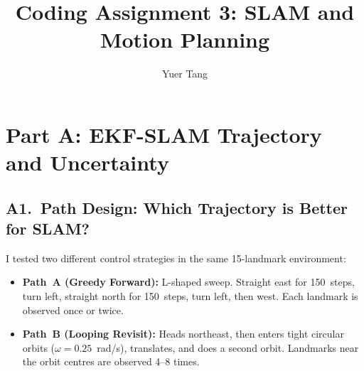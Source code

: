 \documentclass[10pt]{article}
\title{\textbf{Coding Assignment 3: SLAM and Motion Planning}}
\author{Yuer Tang}
\date{}
\begin{document}
\maketitle
\vspace{-1.5em}
\thispagestyle{empty}

\section{Part A: EKF-SLAM Trajectory and Uncertainty}

\subsection{A1.\ Path Design: Which Trajectory is Better for SLAM?}

I tested two different control strategies in the same 15-landmark environment:
\begin{itemize}\itemsep=0pt
  \item \textbf{Path~A (Greedy Forward):} L-shaped sweep. Straight east for 150~steps, turn left, straight north for 150~steps, turn left, then west. Each landmark is observed once or twice.
  \item \textbf{Path~B (Looping Revisit):} Heads northeast, then enters tight circular orbits ($\omega{=}0.25$~rad/s), translates, and does a second orbit. Landmarks near the orbit centres are observed 4--8 times.
\end{itemize}
\end{document}
